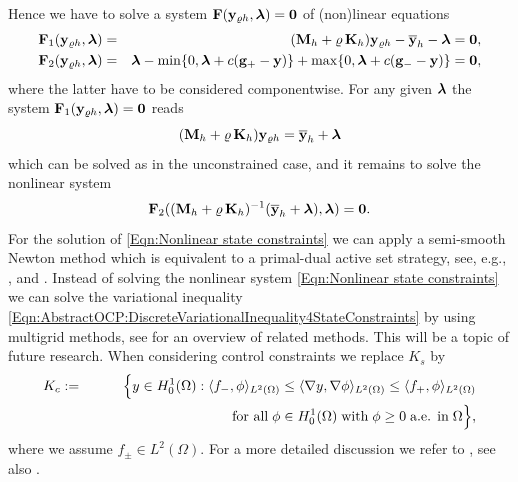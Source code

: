 \documentclass{article}
\numberwithin{equation}{section}
\begin{document}
Hence we have to solve a system
${\mathbf F}({\mathbf y}_{\varrho h},\mbox{\boldmath $\lambda$})=
{\mathbf 0}$ of (non)linear equations
\begin{eqnarray*}
  {\mathbf F}_1({\mathbf y}_{\varrho h},\mbox{\boldmath $\lambda$})
  & = &
  ({\mathbf M}_h + \varrho \, {\mathbf K}_h) {\mathbf y}_{\varrho h} -
  \overline{\mathbf y}_h - \mbox{\boldmath $\lambda$} =
  {\mathbf 0}, \\
  {\mathbf F}_2({\mathbf y}_{\varrho h},\mbox{\boldmath $\lambda$})
  & = &
  \mbox{\boldmath $\lambda$} -
  \min \{ 0 , \mbox{\boldmath $\lambda$} +
  c ( {\mathbf g}_+ - {\mathbf y}) \} +
    \max \{ 0 , \mbox{\boldmath $\lambda$} + c
    ({\mathbf{g}_-- {\mathbf y}) \}
   = {\mathbf 0}},
\end{eqnarray*}
where the latter have to be considered componentwise. For any given
$\mbox{\boldmath $\lambda$}$ the system
$ {\mathbf F}_1({\mathbf y}_{\varrho h},\mbox{\boldmath $\lambda$}) =
{\mathbf 0}$  reads
\[
 ({\mathbf M}_h + \varrho \, {\mathbf K}_h) {\mathbf y}_{\varrho h} =
  \overline{\mathbf y}_h + \mbox{\boldmath $\lambda$} 
\]
which can be solved as in the unconstrained case, and it remains to
solve the nonlinear system
\begin{equation}\label{Eqn:Nonlinear state constraints}
  {\mathbf F}_2(({\mathbf M}_h + \varrho \, {\mathbf K}_h)^{-1}
  (\overline{\mathbf y}_h + \mbox{\boldmath $\lambda$}),
  \mbox{\boldmath $\lambda$})
  =
  {\mathbf{0}} .
\end{equation}
For the solution of \eqref{Eqn:Nonlinear state constraints} we can apply
a semi-smooth Newton method which is equivalent to a primal-dual active
set strategy, see, e.g., \cite{ChenNashedQi:2001,HintermuellerItoKunisch2003SJO,
  HintermuellerUlbrich:2004,ItoKunisch:2008}, and
\cite{GanglLoescherSteinbach2025CAMWA}. Instead of solving the nonlinear
system \eqref{Eqn:Nonlinear state constraints} we can solve the
variational inequality 
\eqref{Eqn:AbstractOCP:DiscreteVariationalInequality4StateConstraints}
by using multigrid methods, see \cite{GraeserKornhuber2009JCM} for
an overview of related methods. This will be a topic of future research.
When considering control constraints we replace
$K_s$ by 
\begin{eqnarray*}
  K_c & := & \Big \{ y \in H^1_0(\Omega) : \langle f_- ,
             \phi \rangle_{L^2(\Omega)}
             \leq \langle \nabla y , \nabla \phi \rangle_{L^2(\Omega)} \leq
             \langle f_+ , \phi \rangle_{L^2(\Omega)} \\
      && \hspace*{3.5cm} \mbox{for all} \; \phi \in H^1_0(\Omega) \;
         \mbox{with} \; \phi \geq 0 \; \mbox{a.e. in} \; \Omega \Big \},
\end{eqnarray*}
where we assume $f_\pm \in L^2(\Omega)$. For a more detailed discussion
we refer to \cite{GanglLoescherSteinbach2025CAMWA},
see also \cite{GongTan2025JSC}.
\end{document}
